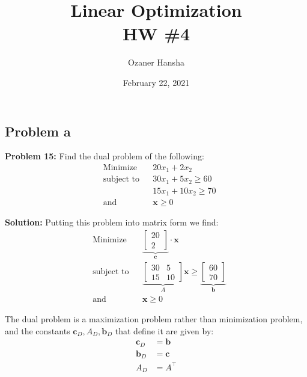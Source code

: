 \documentclass{article}
\renewcommand\vec{\mathbf}
\begin{document}
\title{Linear Optimization\\HW \#4}
\author{Ozaner Hansha}
\date{February 22, 2021}
\maketitle

\subsection*{Problem a}
\noindent\textbf{Problem 15:} Find the dual problem of the following:
$$\begin{aligned}
    &{\text{Minimize}}
    &&20x_1+2x_2\\
    &{\text{subject to}}
    &&30x_{1}+5x_{2}\ge60\\
    &
    &&15x_{1}+10x_{2}\ge70\\
    &{\text{and}}
    &&\vec x\ge 0
\end{aligned}$$
\bigskip

\noindent\textbf{Solution:} Putting this problem into matrix form we find:
$$\begin{aligned}
    &{\text{Minimize}}
    &&\underbrace{\begin{bmatrix}
        20\\2
    \end{bmatrix}}_{\vec c}\cdot\vec x\\
    &{\text{subject to}}
    &&\underbrace{\begin{bmatrix}
        30&5\\15&10
    \end{bmatrix}}_{A}\vec x\ge\underbrace{\begin{bmatrix}
        60\\70
    \end{bmatrix}}_{\vec b}\\
    &{\text{and}}
    &&\vec x\ge 0
\end{aligned}$$

The dual problem is a maximization problem rather than minimization problem, and the constants $\vec c_D,A_D,\vec b_D$ that define it are given by:
\begin{align*}
    \vec c_D&=\vec b\\
    \vec b_D&=\vec c\\
    A_D&=A^\top
\end{align*}
\end{document}
